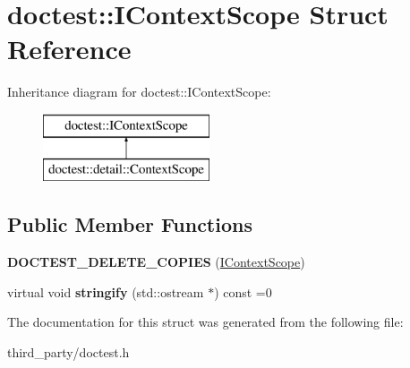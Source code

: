 \hypertarget{structdoctest_1_1_i_context_scope}{}\section{doctest\+::I\+Context\+Scope Struct Reference}
\label{structdoctest_1_1_i_context_scope}
Inheritance diagram for doctest\+::I\+Context\+Scope\+:\begin{figure}[H]
\begin{center}
\leavevmode
\includegraphics[height=2.000000cm]{structdoctest_1_1_i_context_scope}
\end{center}
\end{figure}
\subsection*{Public Member Functions}
\begin{DoxyCompactItemize}
\item 
\mbox{\label{structdoctest_1_1_i_context_scope_ae0f6730c3bf0b7ebe6391fda0d993ea1}} 
{\bfseries D\+O\+C\+T\+E\+S\+T\+\_\+\+D\+E\+L\+E\+T\+E\+\_\+\+C\+O\+P\+I\+ES} (\mbox{\hyperlink{structdoctest_1_1_i_context_scope}{I\+Context\+Scope}})
\item 
\mbox{\label{structdoctest_1_1_i_context_scope_affbf0f9bf8107a4a8a805d237288141d}} 
virtual void {\bfseries stringify} (std\+::ostream $\ast$) const =0
\end{DoxyCompactItemize}


The documentation for this struct was generated from the following file\+:\begin{DoxyCompactItemize}
\item 
third\+\_\+party/doctest.\+h\end{DoxyCompactItemize}
